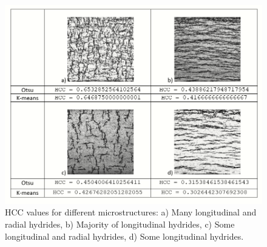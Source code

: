\begin{figure}[h] %
    \centering
    \includegraphics[width=5.5in]{Figures/5-Results/Comparison.PNG}
    \caption{HCC values for different microstructures: a) Many longitudinal and radial hydrides, b) Majority of longitudinal hydrides, c) Some longitudinal and radial hydrides, d) Some longitudinal hydrides.}
    \label{fig:compa}
\end{figure}